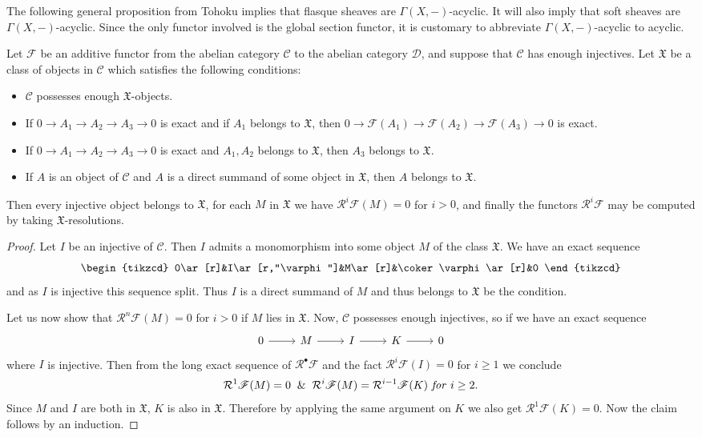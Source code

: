 The following general proposition from Tohoku implies that flasque sheaves are $\Gamma(X,-)$-acyclic. It will also imply that soft sheaves are $\Gamma(X,-)$-acyclic. Since the only functor involved is the global section functor, it is customary to abbreviate $\Gamma(X,-)$-acyclic to acyclic.
\begin{theorem}\label{acyclic thm}
Let $\mathscr{F}$ be an additive functor from the abelian category $\mathcal{C}$ to the abelian category $\mathcal{D}$, and suppose that $\mathcal{C}$ has enough injectives. Let $\mathfrak{X}$ be a class of objects in $\mathcal{C}$ which satisfies the following conditions:
\begin{itemize}
\item $\mathcal{C}$ possesses enough $\mathfrak{X}$-objects.
\item If $0\to A_1\to A_2\to A_3\to 0$ is exact and if $A_1$ belongs to $\mathfrak{X}$, then $0\to\mathscr{F}(A_1)\to\mathscr{F}(A_2)\to\mathscr{F}(A_3)\to 0$ is exact.
\item If $0\to A_1\to A_2\to A_3\to 0$ is exact and $A_1,A_2$ belongs to $\mathfrak{X}$, then $A_3$ belongs to $\mathfrak{X}$.
\item If $A$ is an object of $\mathcal{C}$ and $A$ is a direct summand of some object in $\mathfrak{X}$, then $A$ belongs to $\mathfrak{X}$.
\end{itemize}
Then every injective object belongs to $\mathfrak{X}$, for each $M$ in $\mathfrak{X}$ we have $\mathcal{R}^i\mathscr{F}(M)=0$ for $i>0$, and finally the functors $\mathcal{R}^i\mathscr{F}$ may be computed by taking $\mathfrak{X}$-resolutions.
\end{theorem}
\begin{proof}
Let $I$ be an injective of $\mathcal{C}$. Then $I$ admits a monomorphism into some object $M$ of the class $\mathfrak{X}$. We have an exact sequence
\[\begin{tikzcd}
0\ar[r]&I\ar[r,"\varphi"]&M\ar[r]&\coker\varphi\ar[r]&0
\end{tikzcd}\]
and as $I$ is injective this sequence split. Thus $I$ is a direct summand of $M$ and thus belongs to $\mathfrak{X}$ be the condition.\par
Let us now show that $\mathcal{R}^n\mathscr{F}(M)=0$ for $i>0$ if $M$ lies in $\mathfrak{X}$. Now, $\mathcal{C}$ possesses enough injectives, so if we have an exact sequence
\[\begin{tikzcd}
0\ar[r]&M\ar[r]&I\ar[r]&K\ar[r]&0
\end{tikzcd}\]
where $I$ is injective. Then from the long exact sequence of $\mathcal{R}^\bullet\mathscr{F}$ and the fact $\mathcal{R}^i\mathscr{F}(I)=0$ for $i\geq 1$ we conclude
\[\mathcal{R}^1\mathscr{F}(M)=0\And \mathcal{R}^i\mathscr{F}(M)=\mathcal{R}^{i-1}\mathscr{F}(K)\text{ \textit{for} $i\geq 2$}.\]
Since $M$ and $I$ are both in $\mathfrak{X}$, $K$ is also in $\mathfrak{X}$. Therefore by applying the same argument on $K$ we also get $\mathcal{R}^1\mathscr{F}(K)=0$. Now the claim follows by an induction.
\end{proof}
